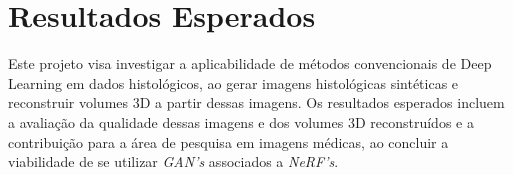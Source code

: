 \section{Resultados Esperados}

Este projeto visa investigar a aplicabilidade de métodos convencionais de Deep Learning em dados histológicos, ao gerar imagens histológicas sintéticas e reconstruir volumes 3D a partir dessas imagens. Os resultados esperados incluem a avaliação da qualidade dessas imagens e dos volumes 3D reconstruídos e a contribuição para a área de pesquisa em imagens médicas, ao concluir a viabilidade de se utilizar \textit{GAN's} associados a \textit{NeRF's}.